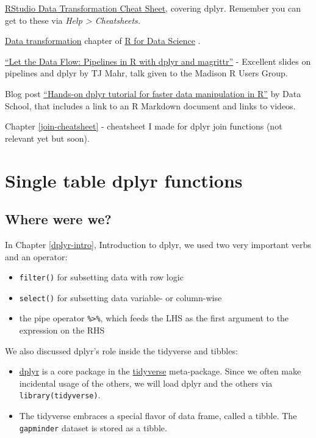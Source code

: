\documentclass[
]{book}
\providecommand{\tightlist}{%
  \setlength{\itemsep}{0pt}\setlength{\parskip}{0pt}}
\begin{document}
\href{https://github.com/rstudio/cheatsheets/raw/master/data-transformation.pdf}{RStudio Data Transformation Cheat Sheet}, covering dplyr. Remember you can get to these via \emph{Help \textgreater{} Cheatsheets.}

\href{https://r4ds.had.co.nz/transform.html}{Data transformation} chapter of \href{https://r4ds.had.co.nz}{R for Data Science} \citep{wickham2016}.

\href{https://github.com/tjmahr/MadR_Pipelines}{``Let the Data Flow: Pipelines in R with dplyr and magrittr''} - Excellent slides on pipelines and dplyr by TJ Mahr, talk given to the Madison R Users Group.

Blog post \href{https://www.dataschool.io/dplyr-tutorial-for-faster-data-manipulation-in-r/}{``Hands-on dplyr tutorial for faster data manipulation in R''} by Data School, that includes a link to an R Markdown document and links to videos.

Chapter \ref{join-cheatsheet} - cheatsheet I made for dplyr join functions (not relevant yet but soon).

\hypertarget{dplyr-single}{%
\chapter{Single table dplyr functions}\label{dplyr-single}}

\hypertarget{where-were-we}{%
\section{Where were we?}\label{where-were-we}}

In Chapter \ref{dplyr-intro}, Introduction to dplyr, we used two very important verbs and an operator:

\begin{itemize}
\tightlist
\item
  \texttt{filter()} for subsetting data with row logic
\item
  \texttt{select()} for subsetting data variable- or column-wise
\item
  the pipe operator \texttt{\%\textgreater{}\%}, which feeds the LHS as the first argument to the expression on the RHS
\end{itemize}

We also discussed dplyr's role inside the tidyverse and tibbles:

\begin{itemize}
\tightlist
\item
  \href{https://dplyr.tidyverse.org}{dplyr} is a core package in the \href{https://tidyverse.tidyverse.org}{tidyverse} meta-package. Since we often make incidental usage of the others, we will load dplyr and the others via \texttt{library(tidyverse)}.
\item
  The tidyverse embraces a special flavor of data frame, called a tibble. The \texttt{gapminder} dataset is stored as a tibble.
\end{itemize}
\end{document}
